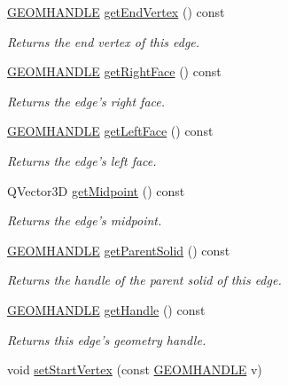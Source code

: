 \begin{DoxyCompactItemize}
\hyperlink{vertex_8h_a72202e57358ed73cd212e9a2eaf39aeb}{G\-E\-O\-M\-H\-A\-N\-D\-L\-E} \hyperlink{class_edge3_d_aa845b1590748b1606697afafb9b33c73}{get\-End\-Vertex} () const 
\begin{DoxyCompactList}\small\item\em Returns the end vertex of this edge. \end{DoxyCompactList}\item 
\hyperlink{vertex_8h_a72202e57358ed73cd212e9a2eaf39aeb}{G\-E\-O\-M\-H\-A\-N\-D\-L\-E} \hyperlink{class_edge3_d_a7dd9278b01fed4abf702c17eeb5c7d8b}{get\-Right\-Face} () const 
\begin{DoxyCompactList}\small\item\em Returns the edge's right face. \end{DoxyCompactList}\item 
\hyperlink{vertex_8h_a72202e57358ed73cd212e9a2eaf39aeb}{G\-E\-O\-M\-H\-A\-N\-D\-L\-E} \hyperlink{class_edge3_d_aaa398af751fda9e8b2192efef0810dc0}{get\-Left\-Face} () const 
\begin{DoxyCompactList}\small\item\em Returns the edge's left face. \end{DoxyCompactList}\item 
Q\-Vector3\-D \hyperlink{class_edge3_d_a2b97448e7bb66cf25e4bcdcff315ab5e}{get\-Midpoint} () const 
\begin{DoxyCompactList}\small\item\em Returns the edge's midpoint. \end{DoxyCompactList}\item 
\hyperlink{vertex_8h_a72202e57358ed73cd212e9a2eaf39aeb}{G\-E\-O\-M\-H\-A\-N\-D\-L\-E} \hyperlink{class_edge3_d_a34d681aaa672935753f2619ebace572b}{get\-Parent\-Solid} () const 
\begin{DoxyCompactList}\small\item\em Returns the handle of the parent solid of this edge. \end{DoxyCompactList}\item 
\hyperlink{vertex_8h_a72202e57358ed73cd212e9a2eaf39aeb}{G\-E\-O\-M\-H\-A\-N\-D\-L\-E} \hyperlink{class_edge3_d_a890650509dd10950ebaa358a349df4c7}{get\-Handle} () const 
\begin{DoxyCompactList}\small\item\em Returns this edge's geometry handle. \end{DoxyCompactList}\item 
void \hyperlink{class_edge3_d_a0533442646913ae69832e3178fa72f9a}{set\-Start\-Vertex} (const \hyperlink{vertex_8h_a72202e57358ed73cd212e9a2eaf39aeb}{G\-E\-O\-M\-H\-A\-N\-D\-L\-E} v)

\end{DoxyCompactItemize}
